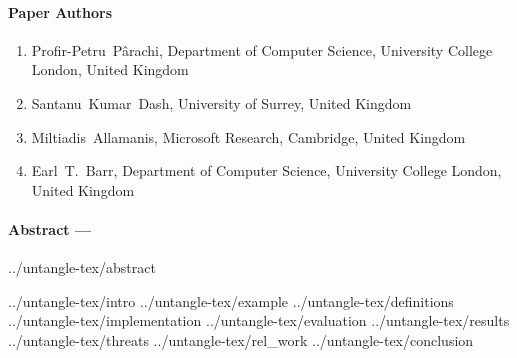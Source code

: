 
\paragraph{Paper Authors}
\begin{enumerate}
    \item[] Profir-Petru~P\^arachi, Department of Computer Science, University College London, United Kingdom
    \item[] Santanu~Kumar~Dash, University of Surrey, United Kingdom
    \item[] Miltiadis~Allamanis, Microsoft Research, Cambridge, United Kingdom
    \item[] Earl~T.~Barr, Department of Computer Science, University College London, United Kingdom
\end{enumerate}

\paragraph{Abstract ---}
{../untangle-tex/abstract}

{../untangle-tex/intro}
{../untangle-tex/example}
{../untangle-tex/definitions}
{../untangle-tex/implementation}
{../untangle-tex/evaluation}
{../untangle-tex/results}
\FloatBarrier
{../untangle-tex/threats}
{../untangle-tex/rel_work}
{../untangle-tex/conclusion}
